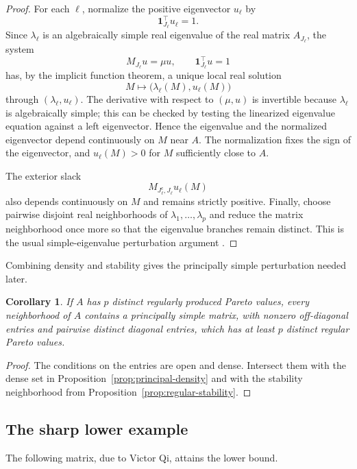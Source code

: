 \documentclass[11pt,a4paper]{article}
\newtheorem{corollary}[theorem]{Corollary}
\theoremstyle{definition}
\newcommand{\one}{\mathbf 1}
\begin{document}
\begin{proof}
For each $\ell$, normalize the positive eigenvector $u_\ell$ by
$$
\one_{J_\ell}^{\top}u_\ell=1.
$$
Since $\lambda_\ell$ is an algebraically simple real eigenvalue of the
real matrix $A_{J_\ell}$, the system
$$
M_{J_\ell}u=\mu u,
\qquad
\one_{J_\ell}^{\top}u=1
$$
has, by the implicit function theorem, a unique local real solution
$$
M\longmapsto
\bigl(\lambda_\ell(M),u_\ell(M)\bigr)
$$
through $(\lambda_\ell,u_\ell)$. The derivative with respect to
$(\mu,u)$ is invertible because $\lambda_\ell$ is algebraically simple;
this can be checked by testing the linearized eigenvalue equation
against a left eigenvector. Hence the eigenvalue and the normalized
eigenvector depend continuously on $M$ near $A$. The normalization
fixes the sign of the eigenvector, and $u_\ell(M)>0$ for $M$
sufficiently close to $A$.

The exterior slack
$$
M_{J_\ell^{\mathrm c},J_\ell}u_\ell(M)
$$
also depends continuously on $M$ and remains strictly positive.
Finally, choose pairwise disjoint real neighborhoods of
$\lambda_1,\ldots,\lambda_p$ and reduce the matrix neighborhood once
more so that the eigenvalue branches remain distinct. This is the
usual simple-eigenvalue perturbation argument
\cite[Chapter~6]{HornJohnson2013}.
\end{proof}

Combining density and stability gives the principally simple
perturbation needed later.

\begin{corollary}
\label{cor:regular-principal-perturbation}
If $A$ has $p$ distinct regularly produced Pareto values, every
neighborhood of $A$ contains a principally simple matrix, with nonzero
off-diagonal entries and pairwise distinct diagonal entries, which has
at least $p$ distinct regular Pareto values.
\end{corollary}

\begin{proof}
The conditions on the entries are open and dense. Intersect them with
the dense set in Proposition~\ref{prop:principal-density} and with the
stability neighborhood from
Proposition~\ref{prop:regular-stability}.
\end{proof}

\subsection{The sharp lower example}

The following matrix, due to Victor Qi, attains the lower bound.
\end{document}
